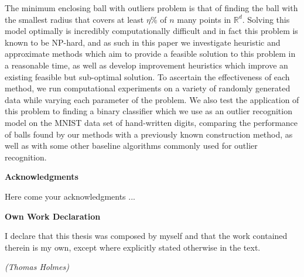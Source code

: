\documentclass[11pt,twoside]{report}
\theoremstyle{definition}
\numberwithin{theorem}{section}
\numberwithin{definition}{section}
\numberwithin{lemma}{section}
\numberwithin{proposition}{section}
\numberwithin{equation}{section}
\numberwithin{figure}{section}
\begin{document}
The minimum enclosing ball with outliers problem is that of finding the ball with the smallest radius that covers at least $\eta\%$ of $n$ many points in $\mathbb{R}^d$. Solving this model optimally is incredibly computationally difficult and in fact this problem is known to be NP-hard, and as such in this paper we investigate heuristic and approximate methods which aim to provide a feasible solution to this problem in a reasonable time, as well as develop improvement heuristics which improve an existing feasible but sub-optimal solution. To ascertain the effectiveness of each method, we run computational experiments on a variety of randomly generated data while varying each parameter of the problem. We also test the application of this problem to finding a binary classifier which we use as an outlier recognition model on the MNIST data set of hand-written digits, comparing the performance of balls found by our methods with a previously known construction method, as well as with some other baseline algorithms commonly used for outlier recognition.

\clearpage
\vspace*{10mm}
\begin{center}
\textbf{\huge{Acknowledgments}}
\end{center}

Here come your acknowledgments ...

\clearpage

\vspace*{10mm}
\begin{center}
\textbf{\huge{Own Work Declaration}}
\end{center}
\vspace*{20mm}

\noindent I declare that this thesis was composed by myself and that the work contained therein is my own, except where explicitly stated otherwise in the text.

\vspace*{10mm}

\begin{flushright}
\textit{(Thomas Holmes)}
\end{flushright}

\cleardoublepage



\pagestyle{plain}
\setcounter{page}{1}
\end{document}
